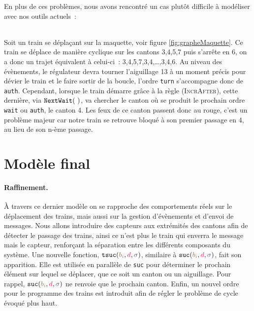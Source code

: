 \documentclass[oneside, a4paper, 11pt]{book}
\newcommand{\ruleFmt}[1]{\textsc{(#1)}}
\newcommand{\ruleDef}[1]{\hypertarget{#1}{\ruleFmt{#1}}}
\newcommand{\sucblock}{{\mathtt{suc}}}
\newcommand{\tsucblock}{{\mathtt{tsuc}}}
\newcommand{\dirFmt}[1]{{\color{dircolor} #1}}
\newcommand{\posFmt}[1]{{\color{poscolor}{#1}}}
\newcommand{\suc}[3]{\ensuremath{\sucblock(\posFmt{#1}, \dirFmt{#2}, \swFmt{#3})}}
\newcommand{\tsuc}[3]{\ensuremath{\tsucblock(\posFmt{#1}, \dirFmt{#2}, \swFmt{#3})}}
\newcommand{\swFmt}[1]{{\color{swcolor}{#1}}}
\newcommand{\nextWait}[1]{\ensuremath{{\tt NextWait}(#1)}}
\begin{document}
En plus de ces problèmes, nous avons rencontré un cas plutôt difficile à modéliser avec nos outils actuels~:
\begin{example}[Cycle]
	~\\

	Soit un train se déplaçant sur la maquette, voir figure \ref{fig:grapheMaquette}. Ce train se déplace de manière cyclique sur les cantons 3,4,5,7 puis s'arrête en 6, on a donc un trajet équivalent à celui-ci~: 3,4,5,7,3,4,\dots,3,4,6.
	Au niveau des évènements, le régulateur devra tourner l'aiguillage 13 à un moment précis pour dévier le train et le faire sortir de la boucle, l'ordre \texttt{turn} s'accompagne donc de \texttt{auth}.
	Cependant, lorsque le train démarre grâce à la règle \ruleDef{IncrAfter}, cette dernière, via \nextWait{~}, va chercher le canton où se produit le prochain ordre \texttt{wait} ou \texttt{auth}, le canton 4. Les feux de ce canton passent donc au rouge, c'est un problème majeur car notre train se retrouve bloqué à son premier passage en 4, au lieu de son n-ème passage.
\end{example}











\section{Modèle final}

\paragraph{Raffinement.} À travers ce dernier modèle on se rapproche des comportements réels sur le déplacement des trains, mais aussi sur la gestion d'évènements et d'envoi de messages.
Nous allons introduire des capteurs aux extrémités des cantons afin de détecter le passage des trains, ainsi ce n'est plus le train qui enverra le message mais le capteur, renforçant la séparation entre les différents composants du système.
Une nouvelle fonction, \tsuc{b_i}{d}{\swFmt{\sigma}}, similaire à \suc{b_i}{d}{\sigma}, fait son apparition. Elle est utilisée en parallèle de \texttt{suc} pour déterminer le prochain élément sur lequel se déplacer, que ce soit un canton ou un aiguillage. Pour rappel, \suc{b_i}{d}{\sigma} ne renvoie que le prochain canton.
Enfin, un nouvel ordre pour le programme des trains est introduit afin de régler le problème de cycle évoqué plus haut.
\end{document}
